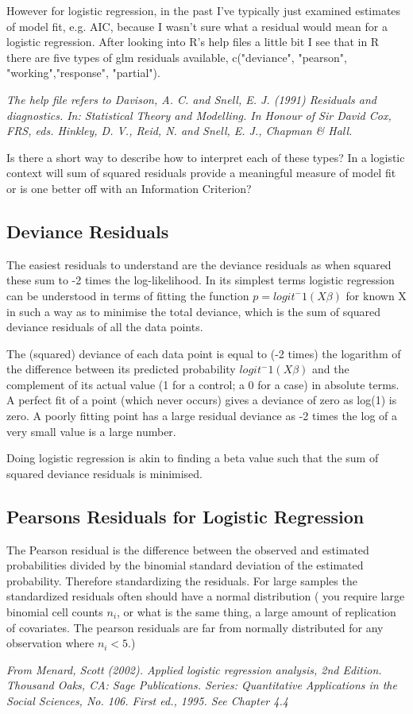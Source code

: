 \documentclass[a4paper,12pt]{article}
\begin{document}
However for logistic regression, in the past I've typically just examined estimates of model fit, e.g. AIC, because I wasn't sure what a residual would mean for a logistic regression. After looking into R's help files a little bit I see that in R there are five types of glm residuals available, c("deviance", "pearson", "working","response", "partial"). 

\textit{The help file refers to Davison, A. C. and Snell, E. J. (1991) Residuals and diagnostics. In: Statistical Theory and Modelling. In Honour of Sir David Cox, FRS, eds. Hinkley, D. V., Reid, N. and Snell, E. J., Chapman \& Hall.}

Is there a short way to describe how to interpret each of these types? In a logistic context will sum of squared residuals provide a meaningful measure of model fit or is one better off with an Information Criterion?

\subsection{Deviance Residuals}
The easiest residuals to understand are the deviance residuals as when squared these sum to -2 times the log-likelihood. In its simplest terms logistic regression can be understood in terms of fitting the function $p=logit^−1(X\beta)$ for known X in such a way as to minimise the total deviance, which is the sum of squared deviance residuals of all the data points.

The (squared) deviance of each data point is equal to (-2 times) the logarithm of the difference between its predicted probability $logit^−1(X\beta)$ and the complement of its actual value (1 for a control; a 0 for a case) in absolute terms. A perfect fit of a point (which never occurs) gives a deviance of zero as log(1) is zero. A poorly fitting point has a large residual deviance as -2 times the log of a very small value is a large number.

Doing logistic regression is akin to finding a beta value such that the sum of squared deviance residuals is minimised.

\subsection{Pearsons Residuals for Logistic Regression}
The Pearson residual is the difference between the observed and estimated probabilities divided by the binomial standard deviation of the estimated probability. Therefore standardizing the residuals. For large samples the standardized residuals often should have a normal distribution ( you require large binomial cell counts $n_i$, or what is the same thing, a large amount of replication of covariates. The pearson residuals are far from normally distributed for any observation where $n_i<5$.)

\textit{From Menard, Scott (2002). Applied logistic regression analysis, 2nd Edition. Thousand Oaks, CA: Sage Publications. Series: Quantitative Applications in the Social Sciences, No. 106. First ed., 1995. See Chapter 4.4}
\end{document}
